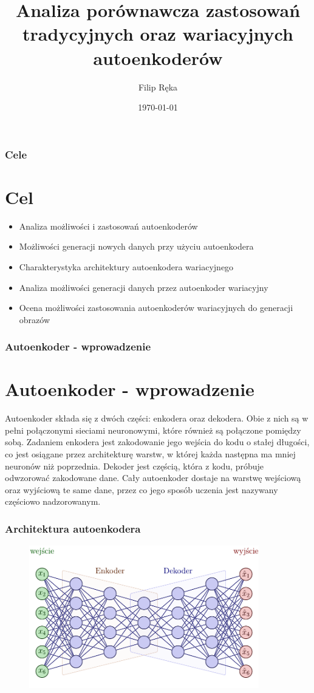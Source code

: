 \documentclass{beamer}
\title[]{Analiza porównawcza zastosowań tradycyjnych oraz wariacyjnych autoenkoderów}
\institute[UMCS]
{
	Uniwersytet Marii Curie Skłodowskiej
	\medskip
}
\author{Filip Ręka}
\date{\today}
\begin{document}
	\begin{frame}
		\titlepage
	\end{frame}
	\begin{frame}
		\frametitle{Cele}
		\section{Cel}
		\begin{itemize}
			\item Analiza możliwości i zastosowań autoenkoderów
			\item Możliwości generacji nowych danych przy użyciu autoenkodera
			\item Charakterystyka architektury autoenkodera wariacyjnego
			\item Analiza możliwości generacji danych przez autoenkoder wariacyjny
			\item Ocena możliwości zastosowania autoenkoderów wariacyjnych do generacji obrazów
		\end{itemize}
	\end{frame}
	\begin{frame}
		\frametitle{Autoenkoder - wprowadzenie}
		\section{Autoenkoder - wprowadzenie}
		Autoenkoder składa się z dwóch części: enkodera oraz dekodera. Obie z nich są w pełni połączonymi sieciami neuronowymi, które również są połączone pomiędzy sobą. Zadaniem enkodera jest zakodowanie jego wejścia do kodu o stałej długości, co jest osiągane przez architekturę warstw, w której każda następna ma mniej neuronów niż poprzednia. Dekoder jest częścią, która z kodu, próbuje odwzorować zakodowane dane. Cały autoenkoder dostaje na warstwę wejściową oraz wyjściową te same dane, przez co jego sposób uczenia jest nazywany częściowo nadzorowanym. 
	\end{frame}

	\begin{frame}
		\frametitle{Architektura autoenkodera}
		\begin{figure}
			\centering\includegraphics[width=10cm]{tikzae.pdf}
		\end{figure}
	\end{frame}
\end{document}
